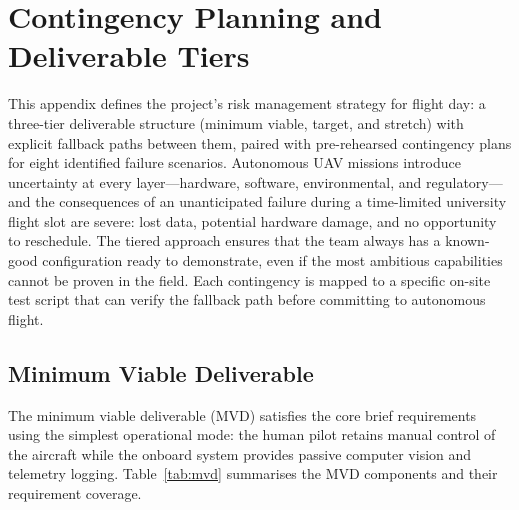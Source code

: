 \section{Contingency Planning and Deliverable Tiers}\label{sec:contingency}

This appendix defines the project's risk management strategy for flight day: a three-tier deliverable structure (minimum viable, target, and stretch) with explicit fallback paths between them, paired with pre-rehearsed contingency plans for eight identified failure scenarios.  Autonomous UAV missions introduce uncertainty at every layer---hardware, software, environmental, and regulatory---and the consequences of an unanticipated failure during a time-limited university flight slot are severe: lost data, potential hardware damage, and no opportunity to reschedule.  The tiered approach ensures that the team always has a known-good configuration ready to demonstrate, even if the most ambitious capabilities cannot be proven in the field.  Each contingency is mapped to a specific on-site test script that can verify the fallback path before committing to autonomous flight.

\subsection{Minimum Viable Deliverable}\label{sec:mvd}

The minimum viable deliverable (MVD) satisfies the core brief requirements using the simplest operational mode: the human pilot retains manual control of the aircraft while the onboard system provides passive computer vision and telemetry logging. Table~\ref{tab:mvd} summarises the MVD components and their requirement coverage.


